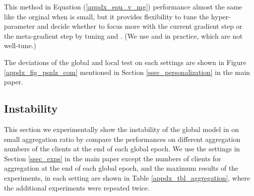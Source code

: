 \documentclass{article}
\begin{document}
This method in Equation (\ref{appdx_equ_v_mg}) performance almost the same like the orginal  when  is small, but it provides flexibility to tune the hyper-parameter and decide whether to focus more with the current gradient step or the meta-gradient step by tuning  and . (We use  and  in practice, which are not well-tune.)

The deviations of the global and local test on each settings are shown in Figure \ref{appdx_fig_psnlz_com} mentioned in Section \ref{ssec_personalization} in the main paper.

\subsection{Instability}
\label{appdx_ssec_instability}

This section we experimentally show the instability of the global model in  on small aggregation ratio by compare the performances on different aggregation numbers of the clients at the end of each global epoch. We use the settings in Section \ref{ssec_exps} in the main paper except the numbers of clients for aggregation at the end of each global epoch, and the maximum results of the experiments, in each setting are shown in Table \ref{appdx_tbl_aggregation}, where the additional experiments were repeated twice.

\begin{table}[t]
    \centering
    \caption{The global test accuracy (\%) of the global model with different numbers of clients for aggregation at the same not-converged global epoch.}
    \label{appdx_tbl_aggregation}
\end{table}
\end{document}
